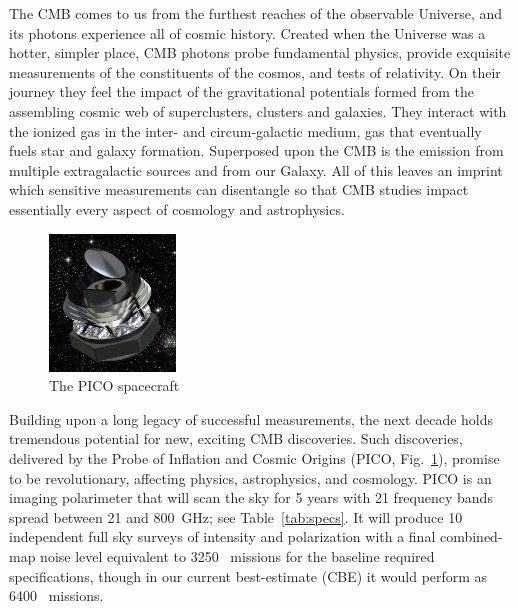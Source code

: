\documentclass[PICOReport.tex]{subfiles}
\begin{document}

The \ac{CMB} comes to us from the furthest reaches of the observable Universe, and its photons experience all of cosmic history.  Created when the Universe was a hotter, simpler place, CMB photons probe fundamental physics, provide exquisite measurements of the constituents of the cosmos, and tests of relativity.  On their journey they feel the impact of the gravitational potentials formed from the assembling cosmic web of superclusters, clusters and galaxies.  They interact with the ionized gas in the inter- and circum-galactic medium, gas that eventually fuels star and galaxy formation.  Superposed upon the CMB is the emission from multiple extragalactic sources and from our Galaxy.  All of this leaves an imprint which sensitive measurements can disentangle so that CMB studies impact essentially every aspect of cosmology and astrophysics.

\begin{figure}  %
\includegraphics[width=0.30\textwidth]{figures/PICO_rendered.jpg}
\vspace{-0.25in}
\caption{\captiontext The PICO spacecraft 
\label{fig:pico_rendered} }
\end{figure}

Building upon a long legacy of successful measurements, the next decade holds tremendous potential for new, exciting \ac{CMB} discoveries.  Such discoveries, delivered by the Probe of Inflation and Cosmic Origins (PICO, Fig.~\ref{fig:pico_rendered}), promise to be revolutionary, affecting physics, astrophysics, and cosmology. PICO is an imaging polarimeter that will scan the sky for 5 years with 21 frequency bands spread between 21 and 800~GHz; see Table~\ref{tab:specs}. It will produce 10 independent full sky surveys of intensity and polarization with a final combined-map noise level equivalent to 3250 \planck\ missions for the baseline required specifications, though in our current best-estimate (CBE) it would perform as 6400 \planck\ missions.  
\end{document}

